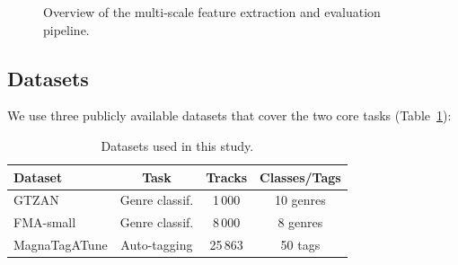 \documentclass[conference]{IEEEtran}
\begin{document}
\begin{figure}[t]
\centering
{}
\caption{Overview of the multi-scale feature extraction and evaluation pipeline.}
\label{fig:pipeline}
\end{figure}

\subsection{Datasets}

We use three publicly available datasets that cover the two core tasks (Table~\ref{tab:datasets}):

\begin{table}[t]
\centering
\caption{Datasets used in this study.}
\label{tab:datasets}
\begin{tabular}{@{}lccc@{}}
\toprule
\textbf{Dataset} & \textbf{Task} & \textbf{Tracks} & \textbf{Classes/Tags} \\
\midrule
GTZAN \cite{tzanetakis2002musical} & Genre classif. & 1\,000 & 10 genres \\
FMA-small \cite{defferrard2017fma} & Genre classif. & 8\,000 & 8 genres \\
MagnaTagATune \cite{law2009evaluation} & Auto-tagging & 25\,863 & 50 tags \\
\bottomrule
\end{tabular}
\end{table}
\end{document}
